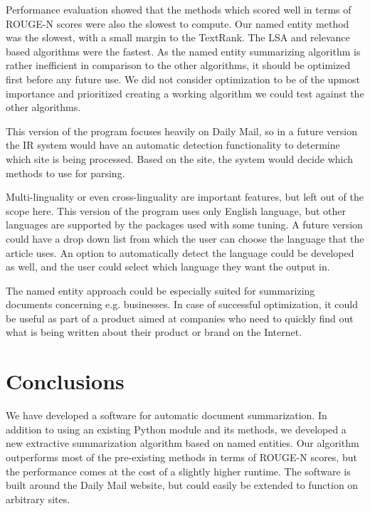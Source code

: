 \documentclass[conference]{IEEEtran}
\begin{document}
Performance evaluation showed that the methods which scored well in terms of ROUGE-N scores were also the slowest to compute. Our named entity method was the slowest, with a small margin to the TextRank. The LSA and relevance based algorithms were the fastest. As the named entity summarizing algorithm is rather inefficient in comparison to the other algorithms, it should be optimized first before any future use. We did not consider optimization to be of the upmost importance and prioritized creating a working algorithm we could test against the other algorithms. 

This version of the program focuses heavily on Daily Mail, so in a future version the IR system would have an automatic detection functionality to determine which site is being processed. Based on the site, the system would decide which methods to use for parsing.

Multi-linguality or even cross-linguality are important features, but left out of the scope here. This version of the program uses only English language, but other languages are supported by the packages used with some tuning. A future version could have a drop down list from which the user can choose the language that the article uses. An option to automatically detect the language could be developed as well, and the user could select which language they want the output in.%

The named entity approach could be especially suited for summarizing documents concerning e.g. businesses. In case of successful optimization, it could be useful as part of a product aimed at companies who need to quickly find out what is being written about their product or brand on the Internet.

\section{Conclusions}\label{conclusions}
We have developed a software for automatic document summarization. In addition to using an existing Python module and its methods, we developed a new extractive summarization algorithm based on named entities. Our algorithm outperforms most of the pre-existing methods in terms of ROUGE-N scores, but the performance comes at the cost of a slightly higher runtime. The software is built around the Daily Mail website, but could easily be extended to function on arbitrary sites. 
\end{document}
